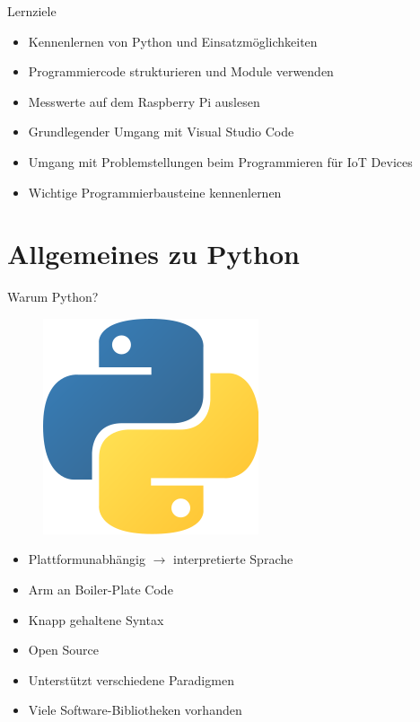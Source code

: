 
\begin{frame}{Lernziele}
    \begin{itemize}
        \item Kennenlernen von Python und  Einsatzmöglichkeiten
        \item Programmiercode strukturieren und Module verwenden
        \item Messwerte auf dem Raspberry Pi auslesen
        \item Grundlegender Umgang mit Visual Studio Code
        \item Umgang mit Problemstellungen beim Programmieren für IoT Devices
        \item Wichtige Programmierbausteine kennenlernen
    \end{itemize}
\end{frame}

\section{Allgemeines zu Python}

\begin{frame}{Warum Python?}
    \begin{figure}[!htb]
        \includegraphics[scale=0.25]{3-python1/img/240px-Python-logo-notext}
    \end{figure}

    \begin{itemize}
        \item Plattformunabhängig  $\rightarrow$ interpretierte Sprache
        \item Arm an Boiler-Plate Code
        \item Knapp gehaltene Syntax
        \item Open Source
        \item Unterstützt verschiedene Paradigmen
        \item Viele Software-Bibliotheken vorhanden
    \end{itemize}
\end{frame}

